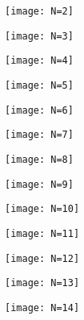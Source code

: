 \documentclass[12pt,a4paper,final]{iopart}
\begin{document}
{\begin{figure}\label{fig:disc1}
\centering
  \begin{subfigure}[b]{0.24\textwidth}
    \texttt{[image: N=2]}
    \label{fig:1}
  \end{subfigure}
  \begin{subfigure}[b]{0.24\textwidth}
    \texttt{[image: N=3]}
    \label{fig:2}
  \end{subfigure}
  \begin{subfigure}[b]{0.24\textwidth}
    \texttt{[image: N=4]}
    \label{fig:1}
  \end{subfigure}
  \begin{subfigure}[b]{0.24\textwidth}
    \texttt{[image: N=5]}
    \label{fig:2}
  \end{subfigure}
  \begin{subfigure}[b]{0.24\textwidth}
    \texttt{[image: N=6]}
    \label{fig:2}
  \end{subfigure}
  \begin{subfigure}[b]{0.24\textwidth}
    \texttt{[image: N=7]}
    \label{fig:2}
  \end{subfigure}
  \begin{subfigure}[b]{0.24\textwidth}
    \texttt{[image: N=8]}
    \label{fig:2}
  \end{subfigure}
  \begin{subfigure}[b]{0.24\textwidth}
    \texttt{[image: N=9]}
    \label{fig:2}
  \end{subfigure}
  \begin{subfigure}[b]{0.24\textwidth}
    \texttt{[image: N=10]}
    \label{fig:2}
  \end{subfigure}
  \begin{subfigure}[b]{0.24\textwidth}
    \texttt{[image: N=11]}
    \label{fig:2}
  \end{subfigure}
  \begin{subfigure}[b]{0.24\textwidth}
    \texttt{[image: N=12]}
    \label{fig:2}
  \end{subfigure}
  \begin{subfigure}[b]{0.24\textwidth}
    \texttt{[image: N=13]}
    \label{fig:2}
  \end{subfigure}
  \begin{subfigure}[b]{0.24\textwidth}
    \texttt{[image: N=14]}
    \label{fig:2}

\end{subfigure}
\end{figure}}
\end{document}
